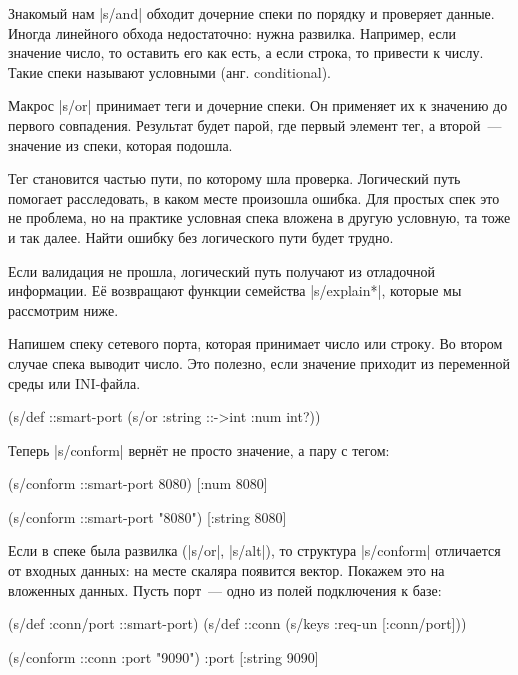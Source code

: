 Знакомый нам \spverb|s/and| обходит дочерние спеки по порядку и проверяет
данные. Иногда линейного обхода недостаточно: нужна развилка. Например, если
значение число, то оставить его как есть, а если строка, то привести к
числу. Такие спеки называют условными (анг. conditional).

Макрос \spverb|s/or| принимает теги и дочерние спеки. Он применяет их к значению
до первого совпадения. Результат будет парой, где первый элемент тег, а
второй~--- значение из спеки, которая подошла.

Тег становится частью пути, по которому шла проверка. Логический путь помогает
расследовать, в каком месте произошла ошибка. Для простых спек это не проблема,
но на практике условная спека вложена в другую условную, та тоже и так
далее. Найти ошибку без логического пути будет трудно.


Если валидация не прошла, логический путь получают из отладочной информации. Е\"{е}
возвращают функции семейства \spverb|s/explain*|, которые мы рассмотрим ниже.

Напишем спеку сетевого порта, которая принимает число или строку. Во втором
случае спека выводит число. Это полезно, если значение приходит из переменной
среды или INI-файла.

\begin{english}
  \begin{clojure}
(s/def ::smart-port
  (s/or :string ::->int :num int?))
  \end{clojure}
\end{english}

\noindent
Теперь \spverb|s/conform| верн\"{е}т не просто значение, а пару с тегом:

\begin{english}
  \begin{clojure}
(s/conform ::smart-port 8080)
[:num 8080]

(s/conform ::smart-port "8080")
[:string 8080]
  \end{clojure}
\end{english}


Если в спеке была развилка (\spverb|s/or|, \spverb|s/alt|), то структура
\spverb|s/conform| отличается от входных данных: на месте скаляра появится
вектор. Покажем это на вложенных данных. Пусть порт~--- одно из полей
подключения к базе:

\begin{english}
  \begin{clojure}
(s/def :conn/port ::smart-port)
(s/def ::conn
  (s/keys :req-un [:conn/port]))

(s/conform ::conn {:port "9090"})
{:port [:string 9090]}
  \end{clojure}
\end{english}

